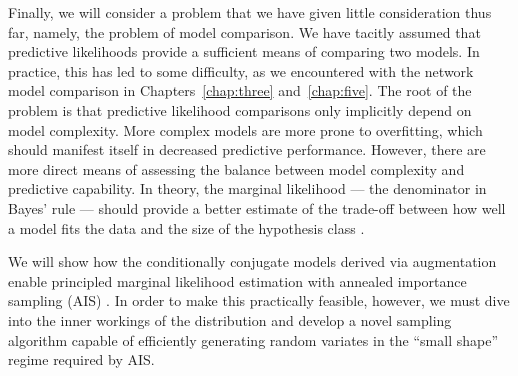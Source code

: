 Finally, we will consider a problem that we have given little
consideration thus far, namely, the problem of model
comparison.  We have tacitly assumed that predictive likelihoods
provide a sufficient means of comparing two models. In practice, this
has led to some difficulty, as we encountered with the network model
comparison in Chapters~\ref{chap:three} and~\ref{chap:five}. 
The root of the problem is that
predictive likelihood comparisons only implicitly depend on model
complexity. More complex models are more prone to overfitting, which 
should manifest itself in decreased predictive performance. However, 
there are more direct means of assessing the balance between 
 model complexity and predictive capability. 
In theory, the marginal likelihood --- the denominator in
Bayes' rule --- should provide a better estimate of the trade-off
between how well a model fits the data and the size of the hypothesis
class  \citep{mackay1992bayesian, kass1995bayes}.

We will show how the conditionally conjugate models derived via \polyagamma
augmentation enable principled marginal likelihood estimation
with annealed importance sampling (AIS) \citep{neal2001annealed}. In order
to make this practically feasible, however, we must dive into the
inner workings of the \polyagamma distribution and develop a novel sampling
algorithm capable of efficiently generating random variates in the
``small shape'' regime required by AIS. 
 
 
